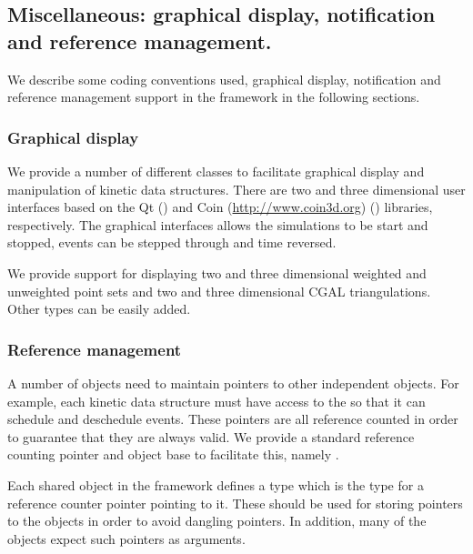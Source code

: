 \subsection{Miscellaneous: graphical display, notification and reference management.}
\label{sec:misc}

We describe some coding conventions used, graphical display,
notification and reference management support in the framework in the
following sections.


\subsubsection{Graphical display}

We provide a number of different classes to facilitate graphical
display and manipulation of kinetic data structures. There are two and
three dimensional user interfaces based on the Qt
() and Coin (\url{http://www.coin3d.org})
() libraries,
respectively.  The graphical interfaces allows the simulations to be
start and stopped, events can be stepped through and time reversed.

We provide support for displaying two and three dimensional weighted
and unweighted point sets and two and three dimensional CGAL
triangulations. Other types can be easily added.

\subsubsection{Reference management}

A number of objects need to maintain pointers to other independent
objects. For example, each kinetic data structure must have access to
the  so that it can schedule and deschedule events. These
pointers are all reference counted in order to guarantee that they are
always valid. We provide a standard reference counting pointer and
object base to facilitate this, namely .

Each shared object in the framework defines a type  which is the
type for a reference counter pointer pointing to it. These should be
used for storing pointers to the objects in order to avoid dangling
pointers. In addition, many of the objects expect such pointers as
arguments.


